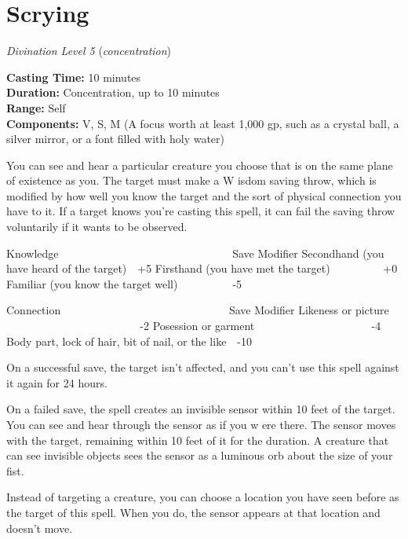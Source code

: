 \documentclass[twocolumn,lettersize]{article}
\begin{document}
  
    {
  

  \section*{Scrying}

    \textit{Divination Level 5} %
    (\textit{concentration})%
             
  \noindent
  \textbf{Casting Time:} 10 minutes \\
  \textbf{Duration:} Concentration, up to 10 minutes\\
  \textbf{Range:} Self \\
  \textbf{Components:} V, S, M (A focus worth at least 1,000 gp, such as a crystal ball, a silver mirror, or a font filled with holy water) 

  You can see and hear a particular creature you choose that is on the same plane 
    of existence as you. The target must make a W isdom saving throw, which is 
    modified by how well you know the target and the sort of physical connection you
     have to it. If a target knows you're casting this spell, it can fail the saving
     throw voluntarily if it wants to be observed.
    
    Knowledge                 Save 
    Modifier
    Secondhand (you have heard of the target) +5
    Firsthand (you have met 
    the target)      +0
    Familiar (you know the target well)     -5
    
    Connection 
                   Save Modifier
    Likeness or picture               -2
    Posession or 
    garment            -4
    Body part, lock of hair, bit of nail, or the like -10
    
    On 
    a successful save, the target isn't affected, and you can't use this spell 
    against it again for 24 hours.
    
    On a failed save, the spell creates an invisible
     sensor within 10 feet of the target. You can see and hear through the sensor as
     if you w ere there. The sensor moves with the target, remaining within 10 feet 
    of it for the duration. A creature that can see invisible objects sees the 
    sensor as a luminous orb about the size of your fist.
    
    Instead of targeting a 
    creature, you can choose a location you have seen before as the target of this 
    spell. When you do, the sensor appears at that location and doesn't move.
    

  } %
\end{document}
